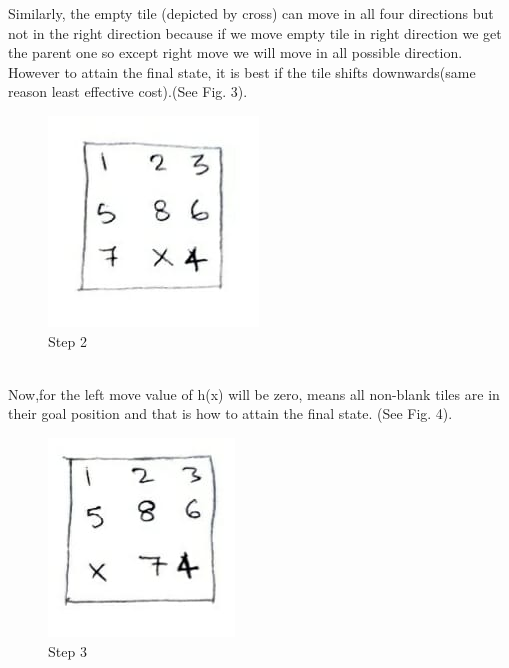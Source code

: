 \documentclass[conference]{IEEEtran}
\begin{document}
Similarly, the empty tile (depicted by cross) can move in all four directions but not in the right direction because if we move empty tile in right direction we get the parent one so except right move we will move in all possible direction. However to attain the final state, it is best if the tile shifts downwards(same reason least effective cost).(See Fig. 3).\\
\begin{figure}[htbp]
    \centering
    \includegraphics[scale = 0.50]{step2.jpeg}
    \caption{Step 2}
\end{figure}\\

Now,for the left move value of h(x) will be zero, means all non-blank tiles are in their goal position and that is how to attain the final state. (See Fig. 4).
\begin{figure}[htbp]
    \centering
    \includegraphics[scale = 0.50]{step3.jpeg}
    \caption{Step 3}
\end{figure}\\
\end{document}
